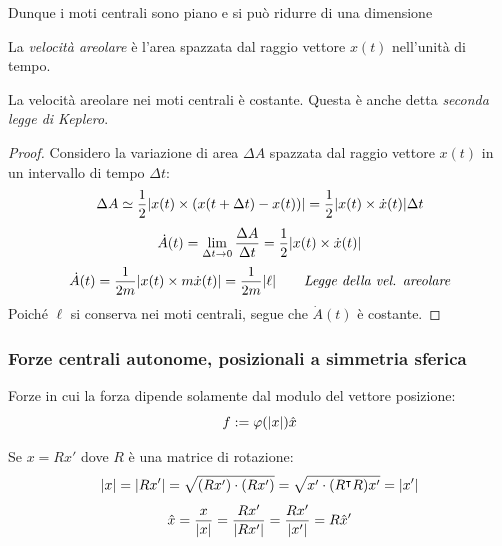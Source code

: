\begin{remark}
    Dunque i moti centrali sono piano e si può ridurre di una dimensione
\end{remark}
\begin{definition}
    La \textit{velocità areolare } è l'area spazzata dal raggio vettore $x(t)$ nell'unità di tempo.
\end{definition}

\begin{proposition}
    La velocità areolare nei moti centrali è costante. Questa è anche detta \textit{seconda legge di Keplero}.
\end{proposition}
\begin{proof}
    Considero la variazione di area $\Delta A$ spazzata dal raggio vettore $x(t)$ in un intervallo di tempo $\Delta t$:
    \begin{equation*}
        \Delta A \simeq \frac{1}{2} \abs{ x(t) \times (x(t+\Delta t) - x(t)) } = \frac{1}{2} \abs{ x(t) \times \dot{x}(t) } \Delta t
    \end{equation*}
    \begin{equation}
        \dot{A}(t) = \lim_{\Delta t \to 0} \frac{\Delta A}{\Delta t} = \frac{1}{2} \abs{ x(t) \times \dot{x}(t) }
    \end{equation}
    \begin{equation}
        \dot{A}(t) = \frac{1}{2m} \abs{ x(t) \times m\dot{x}(t) } = \frac{1}{2m} \abs{ \ell } \qquad \textit{Legge della vel. areolare}
    \end{equation}
    Poiché $\ell$ si conserva nei moti centrali, segue che $\dot{A}(t)$ è costante.
\end{proof}



\subsubsection{Forze centrali autonome, posizionali a simmetria sferica}
Forze in cui la forza dipende solamente dal modulo del vettore posizione:
\begin{equation}
    f:= \varphi(\abs{x})\hat{x}
\end{equation}

Se $x= Rx'$ dove $R$ è una matrice di rotazione:
\begin{equation}
    \abs{x}= \abs{Rx'}= \sqrt{(Rx')\cdot(Rx')}= \sqrt{x'\cdot(R^\intercal R)x'}= \abs{x'}
\end{equation}
\begin{equation}
    \hat{x}=\frac{x}{\abs{x}}= \frac{Rx'}{\abs{Rx'}}= \frac{Rx'}{\abs{x'}}=R\hat{x}'
\end{equation}

